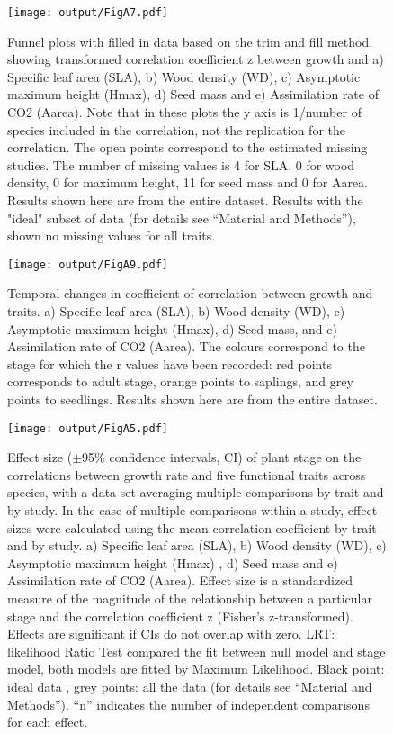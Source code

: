 \documentclass[10pt,twoside]{article}\usepackage[]{graphicx}\usepackage[]{color}
\begin{document}
\begin{figure}[h!]
\centering
\texttt{[image: output/FigA7.pdf]}
\caption{Funnel plots with filled in data based on the trim and fill method, showing transformed correlation coefficient z between growth and a) Specific leaf area (SLA), b) Wood density (WD), c) Asymptotic maximum height (Hmax), d) Seed mass and e) Assimilation rate of CO2 (Aarea). Note that in these plots the y axis is 1/number of species included in the correlation, not the replication for the correlation. The open points correspond to the estimated missing studies. The number of missing values is 4 for SLA, 0 for wood density, 0 for maximum height, 11 for seed mass and 0 for Aarea. Results shown here are from the entire dataset. Results with the "ideal" subset of data (for details see ``Material and Methods''), shown no missing values for all traits.}
\label{fig:figA7}
\end{figure}


\begin{figure}[h!]
\centering
\texttt{[image: output/FigA9.pdf]}
\caption{Temporal changes in coefficient of correlation between growth and traits. a) Specific leaf area (SLA), b) Wood density (WD), c) Asymptotic maximum height (Hmax), d) Seed mass, and e) Assimilation rate of CO2 (Aarea). The colours correspond to the stage for which the r values have been recorded: red points corresponds to adult stage, orange points to saplings, and grey points to seedlings. Results shown here are from the entire dataset.}
\label{fig:figA9}
\end{figure}


\begin{figure}[h!]
\centering
\texttt{[image: output/FigA5.pdf]}
\caption{Effect size ($\pm$95\% confidence intervals, CI) of plant stage on the correlations between growth rate and five functional traits across species, with a data set averaging multiple comparisons by trait and by study. In the case of multiple comparisons within a study, effect sizes were calculated using the mean correlation coefficient by trait and by study. a) Specific leaf area (SLA), b) Wood density (WD), c) Asymptotic maximum height (Hmax) , d) Seed mass and e) Assimilation rate of CO2 (Aarea). Effect size is a standardized measure of the magnitude of the relationship between a particular stage and the correlation coefficient z (Fisher's z-transformed). Effects are significant if CIs do not overlap with zero. LRT: likelihood Ratio Test compared the fit between null model and stage model, both models are fitted by Maximum Likelihood. Black point: ideal data , grey points: all the data (for details see ``Material and Methods''). ``n'' indicates the number of independent comparisons for each effect.}
\label{fig:figA5}
\end{figure}
\end{document}
